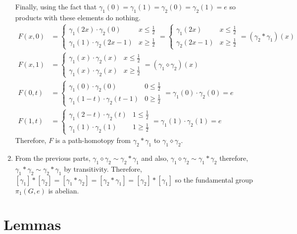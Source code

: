 \documentclass[12pt]{extarticle}
\begin{document}
\begin{enumerate}
Finally, using the fact that $\gamma_1(0) = \gamma_1(1) = \gamma_2(0) = \gamma_2(1) = e$ so products with these elements do nothing. 
\begin{align*}
F(x,0) &= 
\begin{cases}
\gamma_1(2x) \cdot \gamma_2(0) & x \le \frac{1}{2} \\
\gamma_1(1) \cdot \gamma_2(2x - 1) & x \ge \frac{1}{2}
\end{cases} = 
\begin{cases}
\gamma_1(2x) & x \le \frac{1}{2} \\
\gamma_2(2x - 1) & x \ge \frac{1}{2}
\end{cases}
= (\gamma_2 * \gamma_1)(x)
\\
F(x,1) &= 
\begin{cases}
\gamma_1(x) \cdot \gamma_2(x) & x \le \frac{1}{2} \\
\gamma_1(x) \cdot \gamma_2(x) & x \ge \frac{1}{2}
\end{cases}
= (\gamma_1 \diamond \gamma_2)(x)
\\
F(0,t) &= 
\begin{cases}
\gamma_1(0) \cdot \gamma_2(0) & 0 \le \frac{1}{2} \\
\gamma_1(1 - t) \cdot \gamma_2(t - 1) & 0 \ge \frac{1}{2}
\end{cases}
= \gamma_1(0) \cdot \gamma_2(0) = e
\\
F(1,t) &= 
\begin{cases}
\gamma_1(2 - t) \cdot \gamma_2(t) & 1 \le \frac{1}{2} \\
\gamma_1(1) \cdot \gamma_2(1) & 1 \ge \frac{1}{2}
\end{cases}
= \gamma_1(1) \cdot \gamma_2(1) = e
\end{align*}
Therefore, $F$ is a path-homotopy from $\gamma_2 * \gamma_1$ to $\gamma_1 \diamond \gamma_2$.

\item From the previous parts, $\gamma_1 \diamond \gamma_2 \sim \gamma_2 * \gamma_1$ and also, $\gamma_1 \diamond \gamma_2 \sim \gamma_1 * \gamma_2$ therefore, $\gamma_1 * \gamma_2 \sim \gamma_2 * \gamma_1$ by transitivity. Therefore, $[\gamma_1] * [\gamma_2] = [\gamma_1 * \gamma_2] = [\gamma_2 * \gamma_1] = [\gamma_2] * [\gamma_1]$ so the fundamental group $\pi_1(G, e)$ is abelian.     

\end{enumerate}  
            
\section*{Lemmas}
\end{document}
